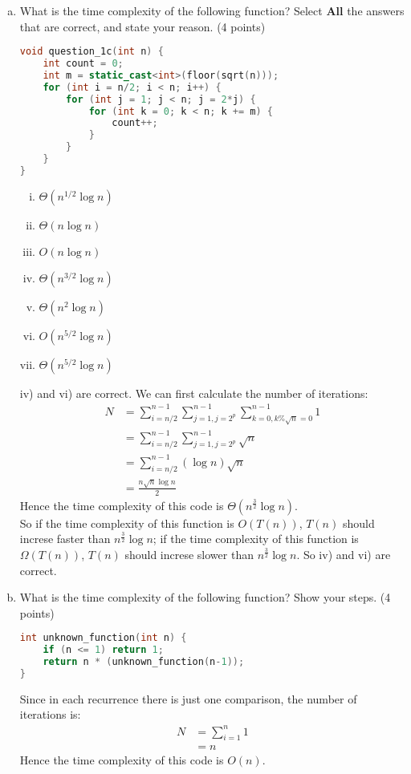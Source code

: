 \documentclass[11pt]{exam}
\begin{document}
\begin{enumerate}[(a)]
\item What is the time complexity of the following function? Select \textbf{All} the answers that are correct, and state your reason.  (4 points)
\begin{lstlisting}[language=c++]
void question_1c(int n) {
	int count = 0;
	int m = static_cast<int>(floor(sqrt(n)));
	for (int i = n/2; i < n; i++) {
		for (int j = 1; j < n; j = 2*j) {
			for (int k = 0; k < n; k += m) {
				count++;
			}
		}
	}
}
\end{lstlisting}
\begin{enumerate}[i)]
\item $\Theta(n^{1/2}\log n)$
\item $\Theta(n \log n)$
\item $O(n \log n)$
\item $\Theta(n^{3/2}\log n)$
\item $\Theta(n^2\log n)$
\item $O(n^{5/2}\log n)$
\item $\Theta(n^{5/2}\log n)$
\end{enumerate}
\begin{solution}
iv) and vi) are correct. We can first calculate the number of iterations:
\begin{equation*}
    \begin{aligned}
    N &=\sum_{i=n/2}^{n-1} \sum_{j=1, j =2^{p}}^{n-1} \sum_{k=0, k \% \sqrt{n}=0}^{n-1} 1 \\
    &=\sum_{i=n/2}^{n-1} \sum_{j=1, j =2^{p}}^{n-1} \sqrt{n} \\
    &=\sum_{i=n/2}^{n-1} (\log n) \sqrt{n} \\
    &=\frac{n \sqrt{n} \log n}{2}
    \end{aligned}
\end{equation*}
Hence the time complexity of this code is $\Theta(n^{\frac{3}{2}}\log n)$. \\
So if the time complexity of this function is $O(T(n))$, $T(n)$ should increse faster than $n^{\frac{3}{2}}\log n$; if the time complexity of this function is $\Omega(T(n))$, $T(n)$ should increse slower than $n^{\frac{3}{2}}\log n$. So iv) and vi) are correct.
\end{solution}

\item What is the time complexity of the following function? Show your steps. (4 points)
\begin{lstlisting}[language=c++]
int unknown_function(int n) {
	if (n <= 1) return 1;
	return n * (unknown_function(n-1));
}
\end{lstlisting}
\begin{solution}
Since in each recurrence there is just one comparison, the number of iterations is:
\begin{equation*}
    \begin{aligned}
    N &=\sum_{i=1}^{n} 1 \\
    &=n
    \end{aligned}
\end{equation*}
Hence the time complexity of this code is $O(n)$.
\end{solution}


\end{enumerate}
\end{document}
